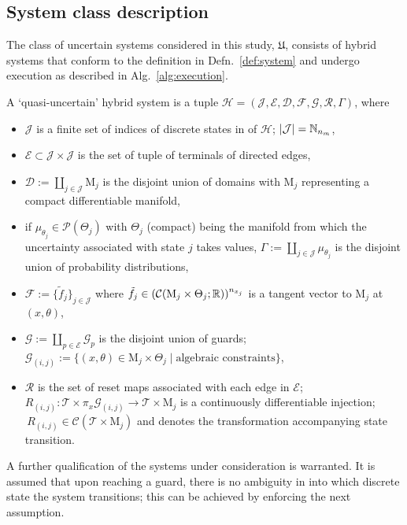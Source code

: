   \subsection{System class description}
  The class of uncertain systems considered in this study, $\mathfrak{U}$, consists of hybrid systems that conform to the definition in Defn.~\ref{def:system} and undergo execution as described in Alg.~\ref{alg:execution}.
\begin{defn}\label{def:system}
  A `quasi-uncertain' hybrid system is a tuple \mbox{$\mathcal H=(\mathcal J,\mathcal E,\mathcal D,\mathcal F,\mathcal G,\mathcal R,\Gamma)$}, where
  \begin{itemize}
    \item $\mathcal J$ is a finite set of indices of discrete states in of $\mathcal H$; $|\mathcal J|=\mathbb{N}_{n_m}$,
    \item $\mathcal E\subset \mathcal J\times \mathcal J$ is the set of tuple of terminals of directed edges,
    \item $\mathcal D:=\coprod_{j\in\mathcal J} \mathrm{M}_j$ is the disjoint union of domains with  $\mathrm{M}_j$ representing a compact differentiable manifold,
    \item if $\mu_{\theta_j}\in \mathcal P(\Theta_j)$ with  $\Theta_j$ (compact) being the manifold from which the uncertainty associated with state $j$ takes values, $\Gamma:=\coprod_{j\in \mathcal J} \mu_{\theta_j}$ is the disjoint union of probability distributions,
    \item $\mathcal F:=\{\tilde f_j\}_{j\in \mathcal J}$ where \mbox{$\tilde f_j\in (\mathcal C(\mathrm{M}_j\times \Theta_j;\mathbb{R}))^{n_{x_j}}$} is a tangent vector to $\mathrm{M}_j$ at $(x,\theta)$,
    \item $\mathcal G:=\coprod_{p\in \mathcal E}\mathcal G_p$ is the disjoint union of guards; \mbox{$\mathcal G_{(i,j)}:=\{(x,\theta)\in \mathrm{M}_j\times \Theta_j\mid \text{algebraic constraints}\}$},
    \item $\mathcal R$ is the set of reset maps associated with each edge in $\mathcal E$; $R_{(i,j)}\colon \mathcal T\times \pi_{x}\mathcal G_{(i,j)}\rightarrow \mathcal T\times\mathrm{M}_j$ is a continuously differentiable injection; $\,R_{(i,j)}\in \mathcal C(\mathcal T\times \mathrm{M}_j)$ and denotes the transformation accompanying state transition.
  \end{itemize}
\end{defn}
A further qualification of the systems under consideration is warranted. It is assumed that upon reaching a guard, there is no ambiguity in into which discrete state the system transitions; this can be achieved by enforcing the next assumption.
